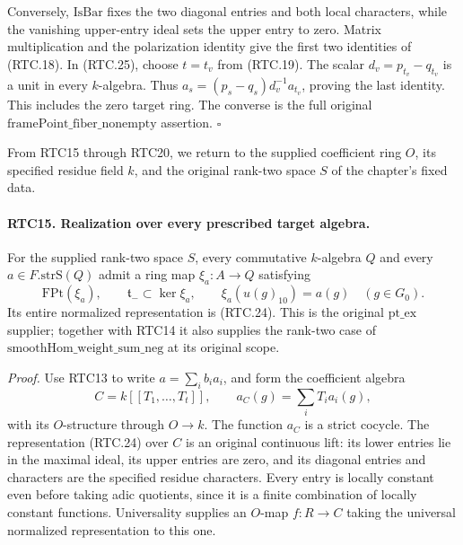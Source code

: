 \documentclass[11pt,a4paper]{article}
\numberwithin{equation}{section}
\theoremstyle{remark}\newtheorem{remark}[theorem]{Remark}
\begin{document}
Conversely, \(\mathrm{IsBar}\) fixes the two diagonal entries
and both local characters, while the vanishing upper-entry ideal
sets the upper entry to zero.  Matrix multiplication and the
polarization identity give the first two identities of (RTC.18).
In (RTC.25), choose \(t=t_v\) from (RTC.19).  The scalar
\(d_v=p_{t_v}-q_{t_v}\) is a unit in every \(k\)-algebra.
Thus
\(a_s=(p_s-q_s)d_v^{-1}a_{t_v}\), proving the last identity.
This includes the zero target ring.  The converse is the full
original \(\mathrm{framePoint\_\allowbreak fiber\_\allowbreak nonempty}\) assertion.
\hfill\(\square\)

From RTC15 through RTC20, we return to the supplied coefficient
ring \(O\), its specified residue field \(k\), and the original
rank-two space \(S\) of the chapter's fixed data.

\paragraph{RTC15. Realization over every prescribed target algebra.}
\label{claim:RTC15}
For the supplied rank-two space \(S\), every commutative
\(k\)-algebra \(Q\) and every \(a\in F.\mathrm{strS}(Q)\)
admit a ring map \(\xi_a:A\to Q\) satisfying
\[
 \mathrm{FPt}(\xi_a),\qquad
 \mathfrak t_-\subset\ker\xi_a,\qquad
 \xi_a(u(g)_{10})=a(g)\quad(g\in G_0).
                                                        \tag{RTC.26}
\]
Its entire normalized representation is (RTC.24).  This is the
original \(\mathrm{pt\_\allowbreak ex}\) supplier; together with RTC14 it
also supplies the rank-two case of
\(\mathrm{smoothHom\_\allowbreak weight\_\allowbreak sum\_\allowbreak neg}\) at its original scope.

\emph{Proof.}
Use RTC13 to write \(a=\sum_i b_i a_i\), and form the
coefficient algebra
\[
 C=k[[T_1,\ldots,T_t]],\qquad
       a_C(g)=\sum_i T_i a_i(g),
                                                        \tag{RTC.27}
\]
with its \(O\)-structure through \(O\to k\).  The function
\(a_C\) is a strict cocycle.  The representation (RTC.24) over
\(C\) is an original continuous lift: its lower entries lie in
the maximal ideal, its upper entries are zero, and its diagonal
entries and characters are the specified residue characters.
Every entry is locally constant even before taking adic quotients,
since it is a finite combination of locally constant functions.
Universality supplies an \(O\)-map \(f:R\to C\) taking the
universal normalized representation to this one.
\end{document}
